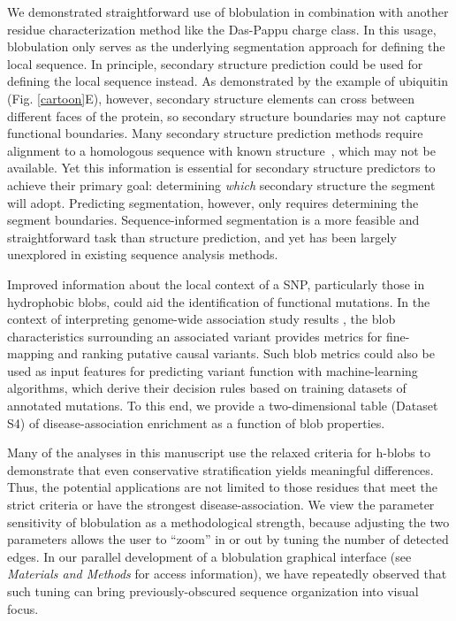 \documentclass[9pt,twocolumn,twoside,lineno]{pnas-new}
\newcommand{\inserted}[1]{{#1}}
\newcommand{\chargechar}{charge class}
\begin{document}
\inserted{We demonstrated straightforward use of blobulation in combination with another residue characterization method like the Das-Pappu \chargechar.} In this usage, blobulation only serves as the underlying segmentation approach for defining the local sequence. In principle, secondary structure prediction could be used for defining the local sequence instead. \inserted{As demonstrated by the example of ubiquitin (Fig. \ref{cartoon}E), however, secondary structure elements can cross between different faces of the protein, so secondary structure boundaries may not capture functional boundaries.} Many secondary structure prediction methods require alignment to a homologous sequence with known structure~\citep{Yang2018, Zhang2018a,Wang2017,Ma2018}, which may not be available. Yet this information is essential for secondary structure predictors to achieve their primary goal: determining \textit{which} secondary structure the segment will adopt. Predicting segmentation, however, only requires determining the segment boundaries. \inserted{Sequence-informed segmentation is a more feasible and straightforward task than structure prediction, and yet has been largely unexplored in existing sequence analysis methods.}

Improved information about the local context of a SNP, particularly those in hydrophobic blobs, could aid the identification of functional mutations. In the context of interpreting genome-wide association study results \citep{Gallagher2018}, the blob characteristics surrounding an associated variant provides metrics for fine-mapping and ranking putative causal variants. Such blob metrics could also be used as input features for predicting variant function with machine-learning algorithms, which derive their decision rules based on training datasets of annotated mutations. To this end, we provide a two-dimensional table (Dataset S4) of disease-association enrichment as a function of blob properties.

\inserted{Many of the analyses in this manuscript use the relaxed criteria for h-blobs to demonstrate that even conservative stratification yields meaningful differences. Thus, the potential applications are not limited to those residues that meet the strict criteria or have the strongest disease-association. We view the parameter sensitivity of blobulation as a methodological strength, because adjusting the two parameters allows the user to ``zoom'' in or out by tuning the number of detected edges. In our parallel development of a blobulation graphical interface (see {\em Materials and Methods} for access information), we have repeatedly observed that such tuning can bring previously-obscured sequence organization into visual focus. } 
\end{document}
